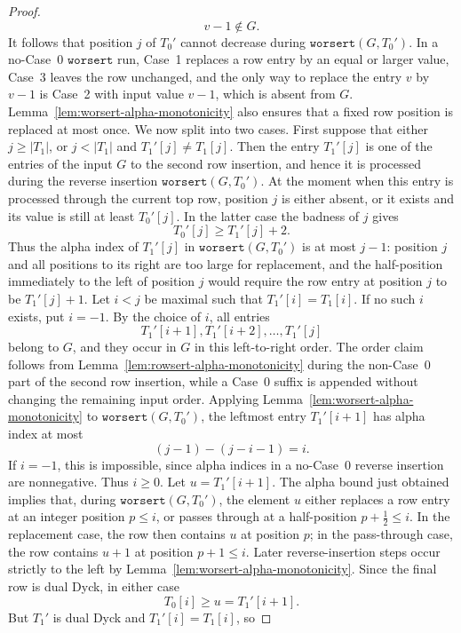 \documentclass[11pt]{article}
\theoremstyle{plain}
\theoremstyle{definition}
\theoremstyle{remark}
\newcommand{\worsert}{\texttt{worsert}}
\begin{document}
\begin{proof}
\[
  v-1\notin G.
\]
It follows that position \(j\) of \(T_0'\) cannot decrease during
\(\worsert(G,T_0')\).  In a no-Case~0 \(\worsert\) run, Case~1 replaces a row
entry by an equal or larger value, Case~3 leaves the row unchanged, and the only
way to replace the entry \(v\) by \(v-1\) is Case~2 with input value \(v-1\),
which is absent from \(G\).  Lemma~\ref{lem:worsert-alpha-monotonicity} also
ensures that a fixed row position is replaced at most once.
We now split into two cases.
First suppose that either \(j\ge |T_1|\), or \(j<|T_1|\) and
\(T_1'[j]\ne T_1[j]\).  Then the entry \(T_1'[j]\) is one of the entries of the
input \(G\) to the second row insertion, and hence it is processed during the
reverse insertion \(\worsert(G,T_0')\).  At the moment when this entry is
processed through the current top row, position \(j\) is either absent, or it
exists and its value is still at least \(T_0'[j]\).  In the latter case the
badness of \(j\) gives
\[
  T_0'[j]\ge T_1'[j]+2.
\]
Thus the alpha index of \(T_1'[j]\) in \(\worsert(G,T_0')\) is at most
\(j-1\): position \(j\) and all positions to its right are too large for
replacement, and the half-position immediately to the left of position \(j\)
would require the row entry at position \(j\) to be \(T_1'[j]+1\).
Let \(i<j\) be maximal such that \(T_1'[i]=T_1[i]\).  If no such \(i\) exists,
put \(i=-1\).  By the choice of \(i\), all entries
\[
  T_1'[i+1],T_1'[i+2],\ldots,T_1'[j]
\]
belong to \(G\), and they occur in \(G\) in this left-to-right order.  The order
claim follows from Lemma~\ref{lem:rowsert-alpha-monotonicity} during the
non-Case~0 part of the second row insertion, while a Case~0 suffix is appended
without changing the remaining input order.
Applying Lemma~\ref{lem:worsert-alpha-monotonicity} to
\(\worsert(G,T_0')\), the leftmost entry \(T_1'[i+1]\) has alpha index at most
\[
  (j-1)-(j-i-1)=i.
\]
If \(i=-1\), this is impossible, since alpha indices in a no-Case~0 reverse
insertion are nonnegative.  Thus \(i\ge0\).
Let \(u=T_1'[i+1]\).  The alpha bound just obtained implies that, during
\(\worsert(G,T_0')\), the element \(u\) either replaces a row entry at an integer
position \(p\le i\), or passes through at a half-position \(p+\frac12\le i\).  In
the replacement case, the row then contains \(u\) at position \(p\); in the
pass-through case, the row contains \(u+1\) at position \(p+1\le i\).  Later
reverse-insertion steps occur strictly to the left by
Lemma~\ref{lem:worsert-alpha-monotonicity}.  Since the final row is dual Dyck,
in either case
\[
  T_0[i]\ge u=T_1'[i+1].
\]
But \(T_1'\) is dual Dyck and \(T_1'[i]=T_1[i]\), so

\end{proof}
\end{document}
